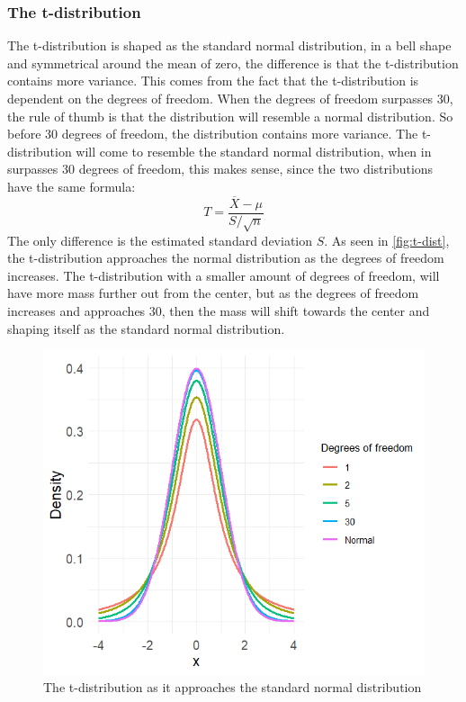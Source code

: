 \subsubsection{The t-distribution}
The t-distribution is shaped as the standard normal distribution, in a bell shape and symmetrical around the mean of zero, the difference is that the t-distribution contains more variance. This comes from the fact that the t-distribution is dependent on the degrees of freedom. When the degrees of freedom surpasses 30, the rule of thumb is that the distribution will resemble a normal distribution. So before 30 degrees of freedom, the distribution contains more variance.
The t-distribution will come to resemble the standard normal distribution, when in surpasses 30 degrees of freedom, this makes sense, since the two distributions have the same formula:
\begin{equation}
	T=\frac{\overline{X}-\mu}{S/\sqrt{n}}
\end{equation}
The only difference is the estimated standard deviation $S$.
As seen in \autoref{fig:t-dist}, the t-distribution approaches the normal distribution as the degrees of freedom increases. The t-distribution with a smaller amount of degrees of freedom, will have more mass further out from the center, but as the degrees of freedom increases and approaches 30, then the mass will shift towards the center and shaping itself as the standard normal distribution.
\begin{figure}[h!]
	\centering
	\begin{minipage}{0.80\textwidth}
		\centering
		\includegraphics[width=\linewidth]{billder/T-distribution.png}
		\caption{The t-distribution as it approaches the standard normal distribution}
		\label{fig:t-dist}
	\end{minipage}\hfill
\end{figure}
